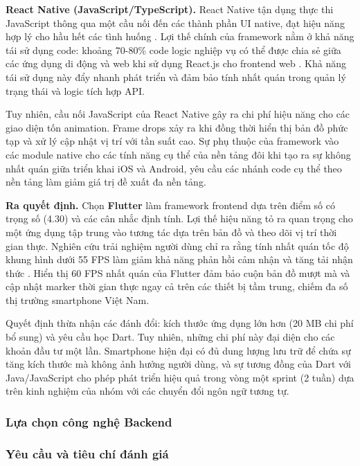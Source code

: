 \textbf{React Native (JavaScript/TypeScript).} React Native tận dụng thực thi JavaScript thông qua một cầu nối đến các thành phần UI native, đạt hiệu năng hợp lý cho hầu hết các tình huống \cite{biorn2018}. Lợi thế chính của framework nằm ở khả năng tái sử dụng code: khoảng 70-80\% code logic nghiệp vụ có thể được chia sẻ giữa các ứng dụng di động và web khi sử dụng React.js cho frontend web \cite{amatya2020}. Khả năng tái sử dụng này đẩy nhanh phát triển và đảm bảo tính nhất quán trong quản lý trạng thái và logic tích hợp API.

Tuy nhiên, cầu nối JavaScript của React Native gây ra chi phí hiệu năng cho các giao diện tốn animation. Frame drops xảy ra khi đồng thời hiển thị bản đồ phức tạp và xử lý cập nhật vị trí với tần suất cao. Sự phụ thuộc của framework vào các module native cho các tính năng cụ thể của nền tảng đôi khi tạo ra sự không nhất quán giữa triển khai iOS và Android, yêu cầu các nhánh code cụ thể theo nền tảng làm giảm giá trị đề xuất đa nền tảng.

\textbf{Ra quyết định.} Chọn \textbf{Flutter} làm framework frontend dựa trên điểm số có trọng số (4.30) và các cân nhắc định tính. Lợi thế hiệu năng tỏ ra quan trọng cho một ứng dụng tập trung vào tương tác dựa trên bản đồ và theo dõi vị trí thời gian thực. Nghiên cứu trải nghiệm người dùng chỉ ra rằng tính nhất quán tốc độ khung hình dưới 55 FPS làm giảm khả năng phản hồi cảm nhận và tăng tải nhận thức \cite{biorn2018}. Hiển thị 60 FPS nhất quán của Flutter đảm bảo cuộn bản đồ mượt mà và cập nhật marker thời gian thực ngay cả trên các thiết bị tầm trung, chiếm đa số thị trường smartphone Việt Nam.

Quyết định thừa nhận các đánh đổi: kích thước ứng dụng lớn hơn (20 MB chi phí bổ sung) và yêu cầu học Dart. Tuy nhiên, những chi phí này đại diện cho các khoản đầu tư một lần. Smartphone hiện đại có đủ dung lượng lưu trữ để chứa sự tăng kích thước mà không ảnh hưởng người dùng, và sự tương đồng của Dart với Java/JavaScript cho phép phát triển hiệu quả trong vòng một sprint (2 tuần) dựa trên kinh nghiệm của nhóm với các chuyển đổi ngôn ngữ tương tự.

\subsubsection{Lựa chọn công nghệ Backend}

\subsubsection*{Yêu cầu và tiêu chí đánh giá}

